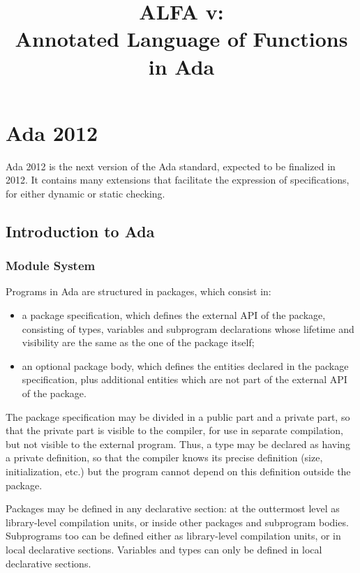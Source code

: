 \documentclass{article}
\title{ALFA v\version:\\Annotated Language of Functions in Ada}
\begin{document}
\maketitle
\sloppy

\newpage

\setcounter{tocdepth}{2}
\tableofcontents

\newpage

\section{Ada 2012}

Ada 2012 is the next version of the Ada standard, expected to be finalized in
2012. It contains many extensions that facilitate the expression of
specifications, for either dynamic or static checking.

\subsection{Introduction to Ada}

\subsubsection{Module System}

Programs in Ada are structured in packages, which consist in:
\begin{itemize}
\item a package specification, which defines the external API of the package,
  consisting of types, variables and subprogram declarations whose lifetime and
  visibility are the same as the one of the package itself;
\item an optional package body, which defines the entities declared in the
  package specification, plus additional entities which are not part of the
  external API of the package.
\end{itemize}

The package specification may be divided in a public part and a private part,
so that the private part is visible to the compiler, for use in separate
compilation, but not visible to the external program. Thus, a type may be
declared as having a private definition, so that the compiler knows its precise
definition (size, initialization, etc.) but the program cannot depend on this
definition outside the package.

Packages may be defined in any declarative section: at the outtermost level as
library-level compilation units, or inside other packages and subprogram
bodies. Subprograms too can be defined either as library-level compilation
units, or in local declarative sections. Variables and types can only be
defined in local declarative sections.
\end{document}
